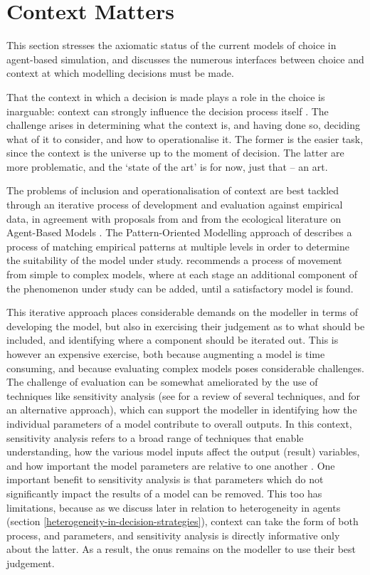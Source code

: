 \documentclass{article}
\begin{document}
\section{Context Matters}
\label{sec:context_matters}

This section stresses the axiomatic status of the current models of choice in agent-based simulation, and discusses the numerous interfaces between choice and context at which modelling decisions must be made.

That the context in which a decision is made plays a role in the choice is inarguable: context can strongly influence the decision process itself \citep{Ben-Akiva2012}. The challenge arises in determining what the context is, and having done so, deciding what of it to consider, and how to operationalise it. The former is the easier task, since the context is the universe up to the moment of decision. The latter are more problematic, and the `state of the art' is for now, just that -- an art. 

The problems of inclusion and operationalisation of context are best tackled through an iterative process of development and evaluation against empirical data, in agreement with proposals from \cite{Cioffi-Revilla2010} and from the ecological literature on Agent-Based Models \citep{Grimm2005, Schmolke2010}. The Pattern-Oriented Modelling approach of \cite{Grimm2005} describes a process of matching empirical patterns at multiple levels in order to determine the suitability of the model under study. \cite{Cioffi-Revilla2010} recommends a process of movement from simple to complex models, where at each stage an additional component of the phenomenon under study can be added, until a satisfactory model is found. 

This iterative approach places considerable demands on the modeller in terms of developing the model, but also in exercising their judgement as to what should be included, and identifying where a component should be iterated out. This is however an expensive exercise, both because augmenting a model is time consuming, and because evaluating complex models poses considerable challenges. The challenge of evaluation can be somewhat ameliorated by the use of techniques like sensitivity analysis (see \citet{Thiele2014} for a review of several techniques, and \citet{Oakley2004} for an alternative approach), which can support the modeller in identifying how the individual parameters of a model contribute to overall outputs. In this context, sensitivity analysis refers to a broad range of techniques that enable understanding, how the various model inputs affect the output (result) variables, and how important the model parameters are relative to one another \citep{Oakley2004, Thiele2014}. One important benefit to sensitivity analysis is that parameters which do not significantly impact the results of a model can be removed. This too has limitations, because as we discuss later in relation to heterogeneity in agents (section \ref{heterogeneity-in-decision-strategies}), context can take the form of both process, and parameters, and sensitivity analysis is directly informative only about the latter. As a result, the onus remains on the modeller to use their best judgement. 
\end{document}
